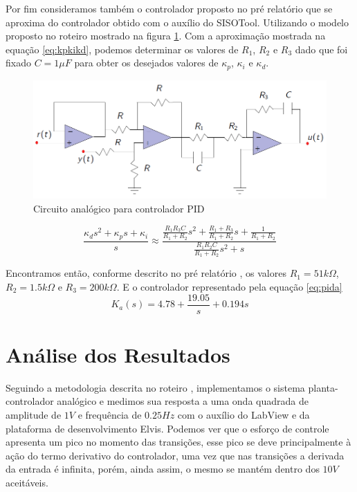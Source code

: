 \documentclass{article}
\begin{document}
Por fim consideramos também o controlador proposto no pré relatório \cite{bb:prelab4} que se aproxima do controlador obtido com o auxílio do SISOTool.
Utilizando o modelo proposto no roteiro \cite{bb:roteiro} mostrado na figura \ref{fig:circuito}. Com a aproximação mostrada na equação \ref{eq:kpkikd}, podemos determinar os valores de $R_1$, $R_2$ e $R_3$ dado que foi fixado $C=1 \mu F$ para obter os desejados valores de $\kappa_p$, $\kappa_i$ e $\kappa_d$.

\begin{figure}[H]
	\centering
	\includegraphics[width=\linewidth]{circuito}
	\caption{Circuito analógico para controlador PID}
	\label{fig:circuito}
\end{figure}

\begin{equation}
\label{eq:kpkikd}
\frac{\kappa_d s^2+\kappa_p s+\kappa_i}{s} \approx \frac{\frac{R_1 R_3 C}{R_1 + R_2} s^2 + \frac{R_1 + R_3}{R_1 + R_2} s+\frac{1}{R_1 + R_2}}{\frac{R_1 R_2 C}{R_1 + R_2}s^2 +s} 
\end{equation}

Encontramos então, conforme descrito no pré relatório \cite{bb:prelab4}, os valores $R_1=51k\Omega$, $R_2=1.5k\Omega$ e $R_3=200k\Omega$. E o controlador representado pela equação \ref{eq:pida}
\begin{equation}
\label{eq:pida}
K_a(s) = 4.78 + \frac{19.05}{s} + 0.194 s
\end{equation}
\section{Análise dos Resultados}
Seguindo a metodologia descrita no roteiro \cite{bb:roteiro}, implementamos o sistema planta-controlador analógico e medimos sua resposta a uma onda quadrada de amplitude de $1V$ e frequência de $0.25Hz$ com o auxílio do LabView e da plataforma de desenvolvimento Elvis. Podemos ver que o esforço de controle apresenta um pico no momento das transições, esse pico se deve principalmente à ação do termo derivativo do controlador, uma vez que nas transições a derivada da entrada é infinita, porém, ainda assim, o mesmo se mantém dentro dos $10V$ aceitáveis.
\end{document}
